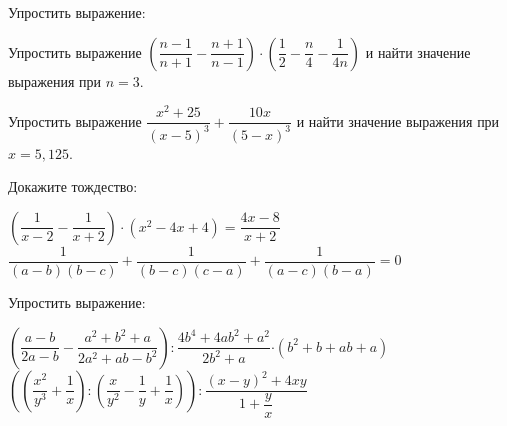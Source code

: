\begin{class}[number=7]
	\begin{listofex}
	\item Упростить выражение:
	\begin{itasks}[1]
		\task {}
		\task {}
	\end{itasks}
	\item Упростить выражение \( \left( \dfrac{n-1}{n+1}-\dfrac{n+1}{n-1} \right)\cdot\left( \dfrac{1}{2}-\dfrac{n}{4}-\dfrac{1}{4n} \right) \) и найти значение выражения при \( n=3 \). 
	\item Упростить выражение \( \dfrac{x^2+25}{(x-5)^3}+\dfrac{10x}{(5-x)^3} \) и найти значение выражения при \( x=5,125 \). 
	\item Докажите тождество:
	\begin{tasks} 
		\task \( \left( \dfrac{1}{x-2}-\dfrac{1}{x+2} \right)\cdot(x^2-4x+4)=\dfrac{4x-8}{x+2} \)
		\task \( \dfrac{1}{(a-b)(b-c)}+\dfrac{1}{(b-c)(c-a)}+\dfrac{1}{(a-c)(b-a)}=0 \)
	\end{tasks}
	\item Упростить выражение:
	\begin{tasks} 
		\task \( \left( \dfrac{a-b}{2a-b}-\dfrac{a^2+b^2+a}{2a^2+ab-b^2} \right):\dfrac{4b^4+4ab^2+a^2}{2b^2+a}{\cdot(b^2+b+ab+a)} \) \answer{ \( \dfrac{b+1}{b-2a} \) }
		\task \( \left( \left( \dfrac{x^2}{y^3}+\dfrac{1}{x} \right):\left( \dfrac{x}{y^2}-\dfrac{1}{y}+\dfrac{1}{x} \right) \right):\dfrac{(x-y)^2+4xy}{1+\dfrac{y}{x}} \) \answer{ \( \dfrac{1}{xy} \) }
	\end{tasks}
	\end{listofex}
\end{class}

